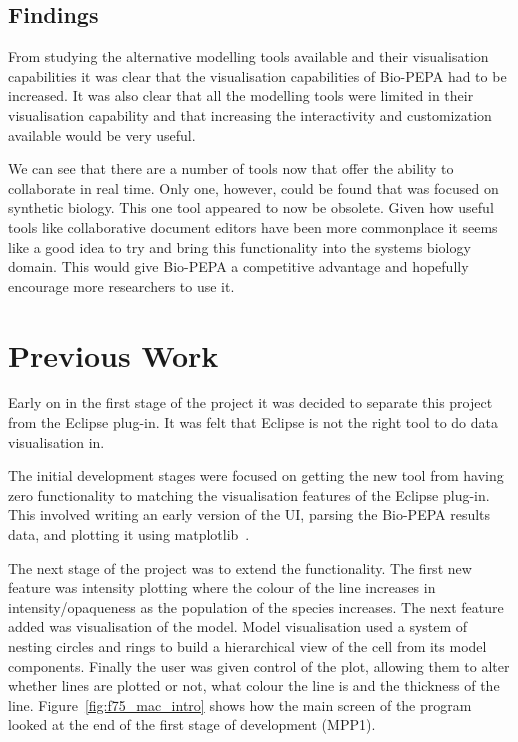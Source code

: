 \subsection{Findings}

From studying the alternative modelling tools available and their visualisation capabilities it was clear that the visualisation capabilities of Bio-PEPA had to be increased.  It was also clear that all the modelling tools were limited in their visualisation capability and that increasing the interactivity and customization available would be very useful.

We can see that there are a number of tools now that offer the ability to collaborate in real time.  Only one, however, could be found that was focused on synthetic biology.  This one tool appeared to now be obsolete.  Given how useful tools like collaborative document editors have been more commonplace it seems like a good idea to try and bring this functionality into the systems biology domain.  This would give Bio-PEPA a competitive advantage and hopefully encourage more researchers to use it.

\section{Previous Work}

Early on in the first stage of the project it was decided to separate this project from the Eclipse plug-in.  It was felt that Eclipse is not the right tool to do data visualisation in.

The initial development stages were focused on getting the new tool from having zero functionality to matching the visualisation features of the Eclipse plug-in.  This involved writing an early version of the \ac{UI}, parsing the Bio-PEPA results data, and plotting it using matplotlib~\cite{mpl}.

The next stage of the project was to extend the functionality.  The first new feature was intensity plotting where the colour of the line increases in intensity/opaqueness as the population of the species increases.  The next feature added was visualisation of the model.  Model visualisation used a system of nesting circles and rings to build a hierarchical view of the cell from its model components.  Finally the user was given control of the plot, allowing them to alter whether lines are plotted or not, what colour the line is and the thickness of the line.  Figure~\ref{fig:f75_mac_intro} shows how the main screen of the program looked at the end of the first stage of development (MPP1).

